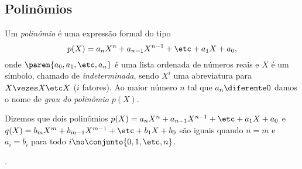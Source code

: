 \subsection{Polinômios}
\label{sec:polinomios}

\begin{definition}[Polinômio]
	Um \emph{polinômio} é uma expressão formal do tipo
	$$
		p(X) = a_n X^n+ a_{n-1} X^{n-1} + \etc + a_1X + a_0,
	$$
	onde $\paren{a_0, a_1 , \etc , a_n}$ é uma lista ordenada de números reais e $X$ é um símbolo, chamado de \emph{indeterminada}, sendo $X^i$ uma abreviatura para $X \vezes X \etc X$ ($i$ fatores). Ao maior número $n$ tal que $a_n \diferente 0$ damos o nome de \emph{grau do polinômio $p(X)$}.
\end{definition}

\begin{definition}
	Dizemos que dois polinômios $p(X) = a_n X^n+ a_{n-1} X^{n-1} + \etc + a_1X + a_0$ e $q(X) = b_m X^m + b_{m-1} X^{m-1} + \etc + b_1X + b_0$ são iguais quando $n=m$ e $a_i = b_i$ para todo $i \no \conjunto{0, 1, \etc, n}$.
\end{definition}

\begin{onlineact}
	.
\end{onlineact}